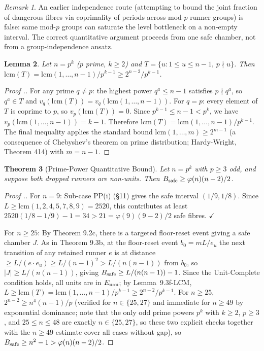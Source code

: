 \documentclass[11pt,a4paper]{article}
\theoremstyle{plain}
\newtheorem{theorem}{Theorem}[section]
\newtheorem{lemma}[theorem]{Lemma}
\theoremstyle{definition}
\theoremstyle{remark}
\newtheorem{remark}[theorem]{Remark}
\begin{document}
\begin{remark}
An earlier independence route (attempting to bound the joint fraction of dangerous fibres via coprimality of periods across mod-$p$ runner groups) is false: same mod-$p$ groups can saturate the level bottleneck on a non-empty interval. The correct quantitative argument proceeds from one safe chamber, not from a group-independence ansatz.

\end{remark}


\begin{lemma}
Let $n = p^k$ ($p$ prime, $k \geq 2$) and $T = \{u : 1 \leq u \leq n-1,\, p \nmid u\}$. Then $\mathrm{lcm}(T) = \mathrm{lcm}(1,\ldots,n-1)/p^{k-1} \geq 2^{n-2}/p^{k-1}$.

\end{lemma}

\begin{proof}[Proof .]
For any prime $q \neq p$: the highest power $q^a \leq n-1$ satisfies $p \nmid q^a$, so $q^a \in T$ and $v_q(\mathrm{lcm}(T)) = v_q(\mathrm{lcm}(1,\ldots,n-1))$. For $q = p$: every element of $T$ is coprime to $p$, so $v_p(\mathrm{lcm}(T)) = 0$. Since $p^{k-1} \leq n-1 < p^k$, we have $v_p(\mathrm{lcm}(1,\ldots,n-1)) = k-1$. Therefore $\mathrm{lcm}(T) = \mathrm{lcm}(1,\ldots,n-1)/p^{k-1}$. The final inequality applies the standard bound $\mathrm{lcm}(1,\ldots,m) \geq 2^{m-1}$ (a consequence of Chebyshev's theorem on prime distribution; Hardy-Wright, Theorem 414) with $m = n-1$.
\end{proof}


\begin{theorem}[Prime-Power Quantitative Bound]
Let $n = p^k$ with $p \geq 3$ odd, and suppose both dropped runners are non-units. Then $B_{\rm safe} \geq \varphi(n)(n-2)/2$.

\end{theorem}

\begin{proof}[Proof .]
For $n=9$: Sub-case PP(i) (§11) gives the safe interval $(1/9,1/8)$. Since $L \geq \mathrm{lcm}(1,2,4,5,7,8,9) = 2520$, this contributes at least $2520(1/8 - 1/9) - 1 = 34 > 21 = \varphi(9)(9-2)/2$ safe fibres. $\checkmark$

For $n \geq 25$: By Theorem 9.2c, there is a targeted floor-reset event giving a safe chamber $J$. As in Theorem 9.3b, at the floor-reset event $b_0 = mL/e_u$ the next transition of any retained runner $e$ is at distance $\geq L/(e \cdot e_u) \geq L/(n-1)^2 > L/(n(n-1))$ from $b_0$, so $|J| \geq L/(n(n-1))$, giving $B_{\rm safe} \geq L/(n(n-1)) - 1$. Since the Unit-Complete condition holds, all units are in $E_{\rm non}$; by Lemma~9.3f-LCM, $L \geq \mathrm{lcm}(T) = \mathrm{lcm}(1,\ldots,n-1)/p^{k-1} \geq 2^{n-2}/p^{k-1}$. For $n \geq 25$, $2^{n-2} \geq n^4(n-1)/p$ (verified for $n \in \{25, 27\}$ and immediate for $n \geq 49$ by exponential dominance; note that the only odd prime powers $p^k$ with $k \geq 2$, $p \geq 3$, and $25 \leq n \leq 48$ are exactly $n \in \{25, 27\}$, so these two explicit checks together with the $n \geq 49$ estimate cover all cases without gap), so $B_{\rm safe} \geq n^2 - 1 > \varphi(n)(n-2)/2$.
\end{proof}
\end{document}
